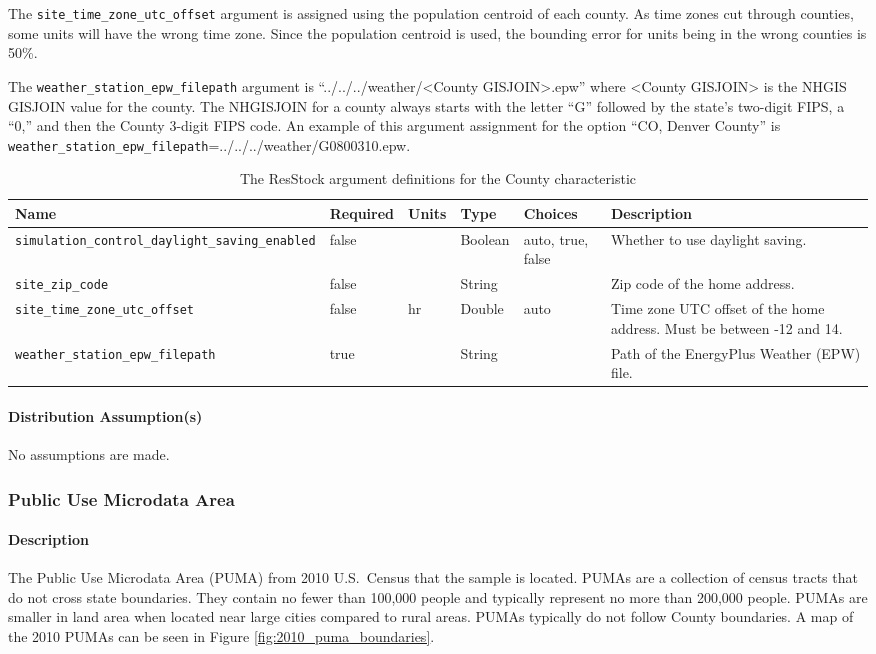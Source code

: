 The \texttt{site\_time\_zone\_utc\_offset} argument is assigned using the population centroid of each county. As time zones cut through counties, some units will have the wrong time zone. Since the population centroid is used, the bounding error for units being in the wrong counties is 50\%.

The \texttt{weather\_station\_epw\_filepath} argument is ``../../../weather/<County GISJOIN>.epw'' where <County GISJOIN> is the NHGIS GISJOIN value for the county. The NHGISJOIN for a county always starts with the letter ``G'' followed by the state's two-digit FIPS, a ``0,'' and then the County 3-digit FIPS code. An example of this argument assignment for the option ``CO, Denver County'' is \texttt{weather\_station\_epw\_filepath}=../../../weather/G0800310.epw.

\begin{longtable}[]{ |p{3.5cm}|p{1.5cm}|p{1cm}|p{1.1cm}|p{1.9cm}|p{5cm}| }
\caption{The ResStock argument definitions for the County characteristic} \label{table:hc_arg_def_county}  \\
\toprule\noalign{}
Name & Required & Units & Type & Choices & Description \\
\midrule\noalign{}
\endhead
\bottomrule\noalign{}
\endlastfoot
\texttt{simulation\_control\_daylight\_saving\_enabled} & false & &
Boolean & auto, true, false & Whether to use daylight saving. \\
\hline
\texttt{site\_zip\_code} & false & & String & & Zip code of the home
address. \\
\hline
\texttt{site\_time\_zone\_utc\_offset} & false & hr & Double & auto &
Time zone UTC offset of the home address. Must be between -12 and 14.  \\
\hline
\texttt{weather\_station\_epw\_filepath} & true & & String & & Path of
the EnergyPlus Weather (EPW) file. \\
\end{longtable}

\paragraph{Distribution Assumption(s)}
No assumptions are made.

\subsubsection{Public Use Microdata Area}
\paragraph{Description}
The Public Use Microdata Area (PUMA) from 2010 U.S.~Census that the sample is located. PUMAs are a collection of census tracts that do not cross state boundaries. They contain no fewer than 100,000 people and typically represent no more than 200,000 people. PUMAs are smaller in land area when located near large cities compared to rural areas. PUMAs typically do not follow County boundaries. A map of the 2010 PUMAs can be seen in Figure \ref{fig:2010_puma_boundaries}.

